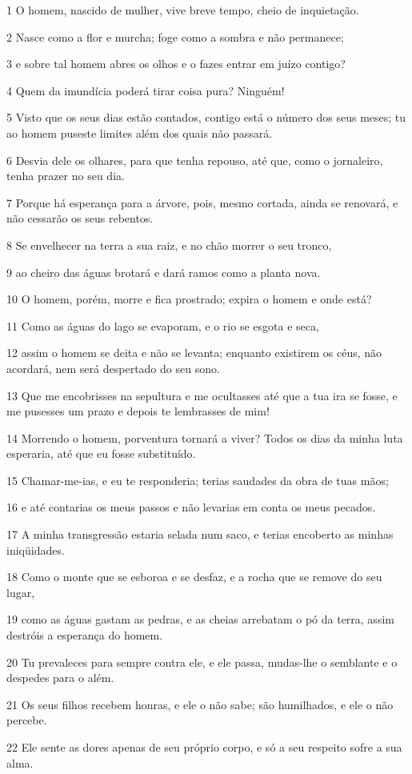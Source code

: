 \par 1 O homem, nascido de mulher, vive breve tempo, cheio de inquietação.
\par 2 Nasce como a flor e murcha; foge como a sombra e não permanece;
\par 3 e sobre tal homem abres os olhos e o fazes entrar em juízo contigo?
\par 4 Quem da imundícia poderá tirar coisa pura? Ninguém!
\par 5 Visto que os seus dias estão contados, contigo está o número dos seus meses; tu ao homem puseste limites além dos quais não passará.
\par 6 Desvia dele os olhares, para que tenha repouso, até que, como o jornaleiro, tenha prazer no seu dia.
\par 7 Porque há esperança para a árvore, pois, mesmo cortada, ainda se renovará, e não cessarão os seus rebentos.
\par 8 Se envelhecer na terra a sua raiz, e no chão morrer o seu tronco,
\par 9 ao cheiro das águas brotará e dará ramos como a planta nova.
\par 10 O homem, porém, morre e fica prostrado; expira o homem e onde está?
\par 11 Como as águas do lago se evaporam, e o rio se esgota e seca,
\par 12 assim o homem se deita e não se levanta; enquanto existirem os céus, não acordará, nem será despertado do seu sono.
\par 13 Que me encobrisses na sepultura e me ocultasses até que a tua ira se fosse, e me pusesses um prazo e depois te lembrasses de mim!
\par 14 Morrendo o homem, porventura tornará a viver? Todos os dias da minha luta esperaria, até que eu fosse substituído.
\par 15 Chamar-me-ias, e eu te responderia; terias saudades da obra de tuas mãos;
\par 16 e até contarias os meus passos e não levarias em conta os meus pecados.
\par 17 A minha transgressão estaria selada num saco, e terias encoberto as minhas iniqüidades.
\par 18 Como o monte que se esboroa e se desfaz, e a rocha que se remove do seu lugar,
\par 19 como as águas gastam as pedras, e as cheias arrebatam o pó da terra, assim destróis a esperança do homem.
\par 20 Tu prevaleces para sempre contra ele, e ele passa, mudas-lhe o semblante e o despedes para o além.
\par 21 Os seus filhos recebem honras, e ele o não sabe; são humilhados, e ele o não percebe.
\par 22 Ele sente as dores apenas de seu próprio corpo, e só a seu respeito sofre a sua alma.

